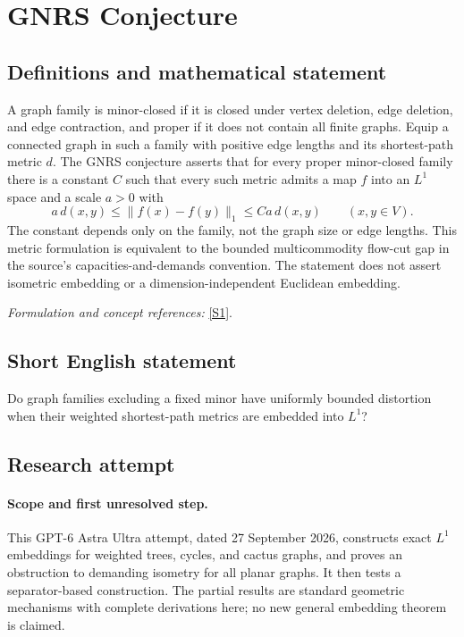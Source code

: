 \documentclass[11pt]{article}
\begin{document}
\section*{\texorpdfstring{GNRS Conjecture}{GNRS Conjecture}}\label{1404}
\subsection{Definitions and mathematical statement}
A graph family is minor-closed if it is closed under vertex deletion, edge deletion, and edge contraction, and proper if it does not contain all finite graphs. Equip a connected graph in such a family with positive edge lengths and its shortest-path metric $d$. The GNRS conjecture asserts that for every proper minor-closed family there is a constant $C$ such that every such metric admits a map $f$ into an $L^1$ space and a scale $a>0$ with
\[
 a\,d(x,y)\le\|f(x)-f(y)\|_1\le C a\,d(x,y)
 \qquad(x,y\in V).
\]
The constant depends only on the family, not the graph size or edge lengths. This metric formulation is equivalent to the bounded multicommodity flow-cut gap in the source's capacities-and-demands convention. The statement does not assert isometric embedding or a dimension-independent Euclidean embedding.
\par\smallskip\textit{Formulation and concept references:} \href{https://arxiv.org/html/2111.07974v1}{[S1]}.

\subsection{Short English statement}
Do graph families excluding a fixed minor have uniformly bounded distortion when their weighted shortest-path metrics are embedded into $L^1$?
\subsection{Research attempt}
\paragraph{Scope and first unresolved step.}
This GPT-6 Astra Ultra attempt, dated 27 September 2026, constructs exact $L^1$ embeddings for weighted trees, cycles, and cactus graphs, and proves an obstruction to demanding isometry for all planar graphs. It then tests a separator-based construction. The partial results are standard geometric mechanisms with complete derivations here; no new general embedding theorem is claimed.
\end{document}
